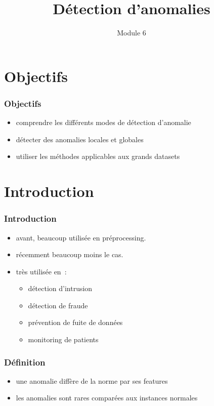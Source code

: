 \documentclass{formation}
\title{Détection d'anomalies}
\subtitle{Module 6}
\begin{document}
\maketitle

\section{Objectifs}

\begin{frame}
  \frametitle{Objectifs}

  \begin{itemize}
  \item comprendre les différents modes de détection d'anomalie
  \item détecter des anomalies locales et globales
  \item utiliser les méthodes applicables aux grands datasets
  \end{itemize}
\end{frame}

\section{Introduction}

\begin{frame}
  \frametitle{Introduction}

  \begin{itemize}[<+->]
  \item avant, beaucoup utilisée en préprocessing. 
  \item récemment beaucoup moins le cas. 
  \item très utilisée en :
    \begin{itemize}
    \item détection d'intrusion
    \item détection de fraude
    \item prévention de fuite de données
    \item monitoring de patients
    \end{itemize}
  \end{itemize}
\end{frame}

\begin{frame}
  \frametitle{Définition}
  \begin{itemize}
  \item une anomalie diffère de la norme par ses features
  \item les anomalies sont rares comparées aux instances normales
  \end{itemize}
\end{frame}
\end{document}
